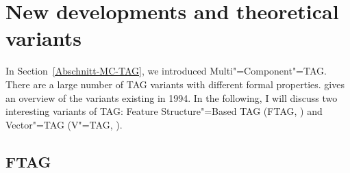 \section{New developments and theoretical variants}

In Section~\ref{Abschnitt-MC-TAG}, we introduced Multi"=Component"=TAG. There are a large number of TAG variants with different formal properties.
\citet[\page
]{Rambow94a} gives an overview of the variants existing in 1994. In the following, I will discuss
two interesting variants of TAG: Feature Structure"=Based TAG (FTAG\indexftag, \citealp{VSJ88a}) and
Vector"=TAG (V"=TAG, \citealp{Rambow94a}). 

\subsection{FTAG}

